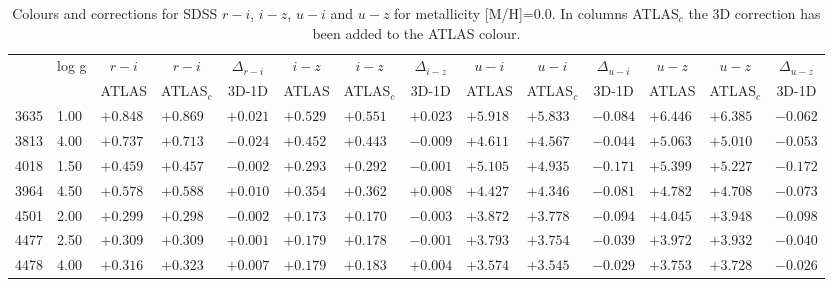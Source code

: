 \documentclass[]{aa}
\def\teff{$T\rm_{eff}$}
\begin{document}
\begin{appendix}
\begin{table*}
\caption{\label{SDSS_2_m00}
Colours and corrections for  SDSS $r-i$, $i-z$, $u-i$ and $u-z$ for metallicity [M/H]=0.0. In columns ATLAS$_c$ the 3D correction
has been added to the ATLAS colour.  }
\renewcommand{\tabcolsep}{3pt}
\tabskip=0pt
\begin{center}
\begin{tabular}{llllllllllllll}
\hline\noalign{\smallskip}
\multicolumn{1}{c}{\teff} & 
\multicolumn{1}{c}{log g} & 
\multicolumn{1}{c}{$r-i$} &
\multicolumn{1}{c}{$r-i$} &
\multicolumn{1}{c}{$\Delta_{r-i}$} &
\multicolumn{1}{c}{$i-z$} &
\multicolumn{1}{c}{$i-z$} &
\multicolumn{1}{c}{$\Delta_{i-z}$} &
\multicolumn{1}{c}{$u-i$} &
\multicolumn{1}{c}{$u-i$} &
\multicolumn{1}{c}{$\Delta_{u-i}$} & 
\multicolumn{1}{c}{$u-z$} &
\multicolumn{1}{c}{$u-z$} &
\multicolumn{1}{c}{$\Delta_{u-z}$} \\
\multicolumn{2}{c}{ } &  
\multicolumn{1}{c}{ATLAS} &
\multicolumn{1}{c}{ATLAS$_c$}&
\multicolumn{1}{c}{3D-1D}&
\multicolumn{1}{c}{ATLAS} &
\multicolumn{1}{c}{ATLAS$_c$}&
\multicolumn{1}{c}{3D-1D}&
\multicolumn{1}{c}{ATLAS} &
\multicolumn{1}{c}{ATLAS$_c$}&
\multicolumn{1}{c}{3D-1D}&
\multicolumn{1}{c}{ATLAS} &
\multicolumn{1}{c}{ATLAS$_c$}&
\multicolumn{1}{c}{3D-1D} \\
\hline\noalign{\smallskip}
\hline\noalign{\smallskip}
3635  &1.00 & $+0.848$ & $+0.869$ & $+0.021$ & $+0.529$ & $+0.551$ & $+0.023$ & $+5.918$ & $+5.833$ & $-0.084$ & $+6.446$ & $+6.385$ & $-0.062$ \\
3813  &4.00 & $+0.737$ & $+0.713$ & $-0.024$ & $+0.452$ & $+0.443$ & $-0.009$ & $+4.611$ & $+4.567$ & $-0.044$ & $+5.063$ & $+5.010$ & $-0.053$ \\
4018  &1.50 & $+0.459$ & $+0.457$ & $-0.002$ & $+0.293$ & $+0.292$ & $-0.001$ & $+5.105$ & $+4.935$ & $-0.171$ & $+5.399$ & $+5.227$ & $-0.172$ \\
3964  &4.50 & $+0.578$ & $+0.588$ & $+0.010$ & $+0.354$ & $+0.362$ & $+0.008$ & $+4.427$ & $+4.346$ & $-0.081$ & $+4.782$ & $+4.708$ & $-0.073$ \\
4501  &2.00 & $+0.299$ & $+0.298$ & $-0.002$ & $+0.173$ & $+0.170$ & $-0.003$ & $+3.872$ & $+3.778$ & $-0.094$ & $+4.045$ & $+3.948$ & $-0.098$ \\
4477  &2.50 & $+0.309$ & $+0.309$ & $+0.001$ & $+0.179$ & $+0.178$ & $-0.001$ & $+3.793$ & $+3.754$ & $-0.039$ & $+3.972$ & $+3.932$ & $-0.040$ \\
4478  &4.00 & $+0.316$ & $+0.323$ & $+0.007$ & $+0.179$ & $+0.183$ & $+0.004$ & $+3.574$ & $+3.545$ & $-0.029$ & $+3.753$ & $+3.728$ & $-0.026$ \\

\end{tabular}
\end{center}
\end{table*}
\end{appendix}
\end{document}
